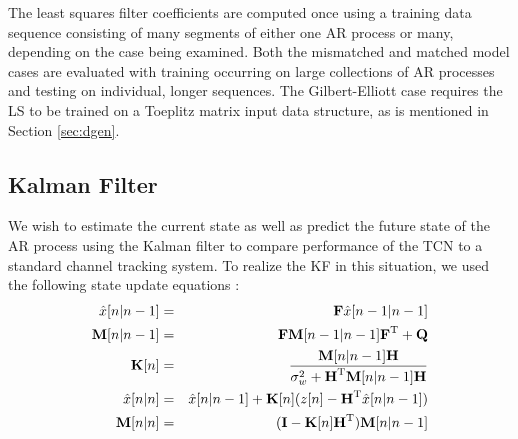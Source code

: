 \documentclass[twocolumn,letterpaper]{IEEEAerospaceCLS}  %
\begin{document}
The least squares filter coefficients are computed once using a training data sequence consisting of many segments of either one AR process or many, depending on the case being examined. Both the mismatched and matched model cases are evaluated with training occurring on large collections of AR processes and testing on individual, longer sequences. The Gilbert-Elliott case requires the LS to be trained on a Toeplitz matrix input data structure, as is mentioned in Section \ref{sec:dgen}.
 

\subsection{Kalman Filter}

 We wish to estimate the current state as well as predict the future state of the AR process using the Kalman filter to compare performance of the TCN to a standard channel tracking system. To realize the KF in this situation, we used the following state update equations \cite{kay1993fundamentals}: \\
\begin{align}
\begin{aligned}                         
\hat{x}[n|n-1]&=&\textbf{F}\hat{x}[n-1|n-1] \\
\textbf{M}[n|n-1]&=&\textbf{FM}[n-1|n-1]\textbf{F}^{\rm T} + \textbf{Q} \\
\textbf{K}[n]&=&\frac{\textbf{M}[n|n-1]\textbf{H}}{\sigma_{w}^{2} + \textbf{H}^{\rm T}\textbf{M}[n|n-1]\textbf{H}} \\
\hat{x}[n|n]&=&\hat{x}[n|n-1] + \textbf{K}[n](z[n]-\textbf{H}^{\rm T}\hat{x}[n|n-1]) \\
\textbf{M}[n|n]&=&(\textbf{I}-\textbf{K}[n]\textbf{H}^{\rm T})\textbf{M}[n|n-1]
\end{aligned}
\end{align}
\end{document}
